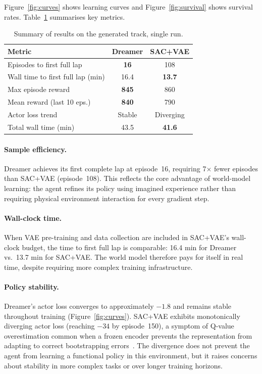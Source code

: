 \documentclass[10pt,twocolumn]{article}
\begin{document}
Figure~\ref{fig:curves} shows learning curves and Figure~\ref{fig:survival}
shows survival rates.
Table~\ref{tab:results} summarises key metrics.

\begin{table}[h]
\centering\small
\caption{Summary of results on the generated track, single run.}
\label{tab:results}
\begin{tabular}{lcc}
\toprule
Metric & Dreamer & SAC+VAE \\
\midrule
Episodes to first full lap          & \textbf{16}  & 108   \\
Wall time to first full lap (min)   & 16.4         & \textbf{13.7} \\
Max episode reward                  & \textbf{845} & 860   \\
Mean reward (last 10 eps.)          & \textbf{840} & 790   \\
Actor loss trend                    & Stable       & Diverging \\
Total wall time (min)               & 43.5         & \textbf{41.6} \\
\bottomrule
\end{tabular}
\end{table}

\paragraph{Sample efficiency.}
Dreamer achieves its first complete lap at episode~16, requiring
7$\times$ fewer episodes than SAC+VAE (episode~108).
This reflects the core advantage of world-model learning: the agent
refines its policy using imagined experience rather than requiring
physical environment interaction for every gradient step.

\paragraph{Wall-clock time.}
When VAE pre-training and data collection are included in SAC+VAE's
wall-clock budget, the time to first full lap is comparable:
16.4 min for Dreamer vs.\ 13.7 min for SAC+VAE.
The world model therefore pays for itself in real time,
despite requiring more complex training infrastructure.

\paragraph{Policy stability.}
Dreamer's actor loss converges to approximately $-1.8$ and remains
stable throughout training (Figure~\ref{fig:curves}).
SAC+VAE exhibits monotonically diverging actor loss
(reaching $-34$ by episode~150), a symptom of Q-value overestimation
common when a frozen encoder prevents the representation from adapting
to correct bootstrapping errors~\cite{laskin2020curl}.
The divergence does not prevent the agent from learning a functional
policy in this environment, but it raises concerns about stability
in more complex tasks or over longer training horizons.
\end{document}
